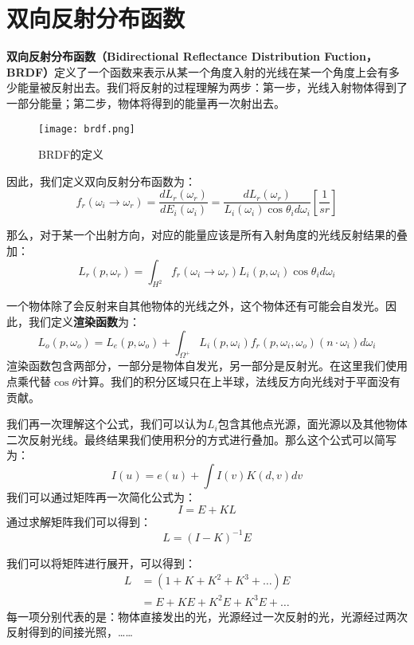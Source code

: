 \documentclass[openany]{progbookcn}
\begin{document}
\section{双向反射分布函数}
\textbf{双向反射分布函数（Bidirectional Reflectance Distribution Fuction，BRDF）}定义了一个函数来表示从某一个角度入射的光线在某一个角度上会有多少能量被反射出去。我们将反射的过程理解为两步：第一步，光线入射物体得到了一部分能量；第二步，物体将得到的能量再一次射出去。

\begin{figure}[H]
	\centering
	\texttt{[image: brdf.png]}
	\caption{BRDF的定义}
	\label{fig:brdf}
\end{figure}

因此，我们定义双向反射分布函数为：
\begin{equation}
	f_r(\omega_i\rightarrow \omega_r)=\frac{dL_r(\omega_r)}{dE_i(\omega_i)}=\frac{dL_r(\omega_r)}{L_i(\omega_i)\cos\theta_i d\omega_i}[\frac{1}{sr}]
\end{equation}

那么，对于某一个出射方向，对应的能量应该是所有入射角度的光线反射结果的叠加：
\begin{equation}
	L_r(p,\omega_r)=\int_{H^2}f_r(\omega_i\rightarrow \omega_r)L_i(p,\omega_i)\cos\theta_id\omega_i
\end{equation}

一个物体除了会反射来自其他物体的光线之外，这个物体还有可能会自发光。因此，我们定义\textbf{渲染函数}为：
\begin{equation}
	L_o(p,\omega_o)=L_e(p,\omega_o)+\int_{\Omega^+}L_i(p,\omega_i)f_r(p,\omega_i,\omega_o)(n\cdot \omega_i)d\omega_i
\end{equation}渲染函数包含两部分，一部分是物体自发光，另一部分是反射光。在这里我们使用点乘代替$\cos\theta$计算。我们的积分区域只在上半球，法线反方向光线对于平面没有贡献。

我们再一次理解这个公式，我们可以认为$L_i$包含其他点光源，面光源以及其他物体二次反射光线。最终结果我们使用积分的方式进行叠加。那么这个公式可以简写为：
\begin{equation}
	I(u)=e(u)+\int I(v)K(d,v)dv
\end{equation} 我们可以通过矩阵再一次简化公式为：
\begin{equation}
	I=E+KL
\end{equation}
通过求解矩阵我们可以得到：
\begin{equation}
	L=(I-K)^{-1}E
\end{equation}

我们可以将矩阵进行展开，可以得到：
\begin{equation}
	\begin{split}
		L&=(1+K+K^2+K^3+\dots)E\\
		&=E+KE+K^2E+K^3E+\dots
	\end{split}
\end{equation}
每一项分别代表的是：物体直接发出的光，光源经过一次反射的光，光源经过两次反射得到的间接光照，……
\end{document}
